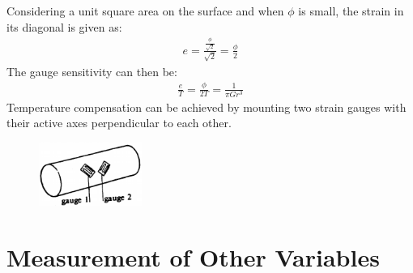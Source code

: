 \documentclass[class=report, crop=false, 12pt,a4paper]{standalone}
\begin{document}
Considering a unit square area on the surface and when $\phi$ is small, the strain in its diagonal is given as:
\begin{gather}
  e = \frac{\frac{\phi}{\sqrt{2}}}{\sqrt{2}} = \frac{\phi}{2}
\end{gather}
The gauge sensitivity can then be: 
\begin{gather}
  \frac{e}{T} = \frac{\phi}{2T} = \frac{1}{\pi Gr^3}
\end{gather}
Temperature compensation can be achieved by mounting two strain gauges with their active axes perpendicular to each other.
\begin{figure}[H]
  \centering
  \includegraphics[width = 0.3\textwidth]{../img/Mdiagram51.png}
\end{figure}
\section{Measurement of Other Variables}
\end{document}
